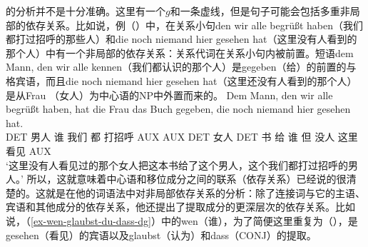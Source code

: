 \citet{GO2009a}的分析并不是十分准确。这里有一个$g$和一条虚线，但是句子可能会包括多重非局部的依存关系。比如说，例（）中，在关系小句den wir alle begrüßt haben（我们都打过招呼的那些人）和die noch niemand hier
  gesehen hat（这里没有人看到的那个人）中有一个非局部的依存关系：关系代词在关系小句内被前置。短语dem Mann, den wir alle kennen（我们都认识的那个人）是gegeben（给）的前置的与格宾语，而且die noch niemand hier gesehen
  hat（这里还没有人看到的那个人）是从Frau （女人）为中心语的NP中外置而来的。
\ea
\gll Dem Mann, den wir alle begrüßt haben, hat die Frau das Buch gegeben, die noch niemand hier gesehen hat.\\
     DET 男人   谁 我们 都 打招呼 AUX      AUX DET 女人 DET 书 给 谁 但 没人 这里 看见 AUX\\
\glt `这里没有人看见过的那个女人把这本书给了这个男人，这个我们都打过招呼的男人。'
\z
所以，这就意味着中心语和移位成分之间的联系（依存关系）已经说的很清楚的。这就是\citet{Hudson97a,Hudson2000a}在他的词语法中对非局部依存关系的分析：除了连接词与它的主语、宾语和其他成分的依存关系，他还提出了提取成分的更深层次的依存关系。比如说，（\ref{ex-wen-glaubst-du-dass-dg}）中的wen（谁），为了简便这里重复为（），是gesehen（看见）的宾语以及glaubst（认为）和dass（CONJ）的提取。
